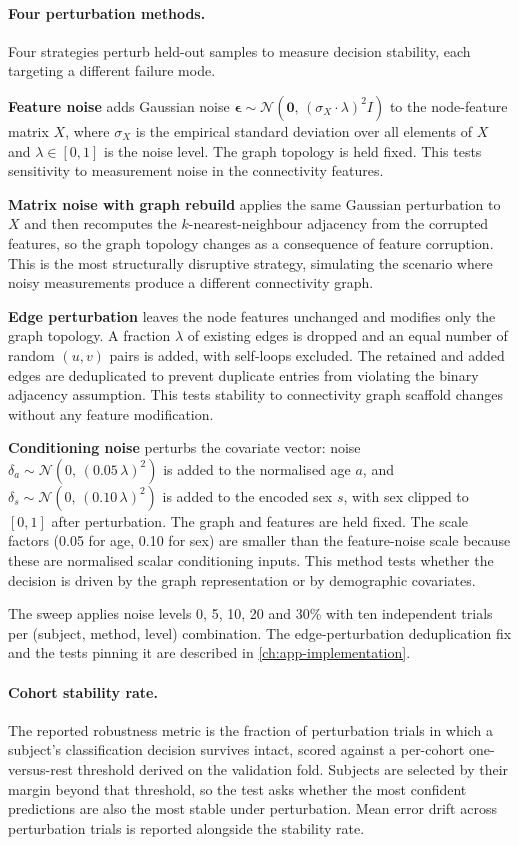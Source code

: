 \paragraph{Four perturbation methods.}
Four strategies perturb held-out samples to measure decision stability, each targeting a
different failure mode.

\textbf{Feature noise} adds Gaussian noise
$\boldsymbol{\epsilon} \sim \mathcal{N}(\mathbf{0},\, (\sigma_X \cdot \lambda)^2 I)$
to the node-feature matrix $X$, where $\sigma_X$ is the empirical standard deviation over
all elements of $X$ and $\lambda \in [0,1]$ is the noise level. The graph topology is
held fixed. This tests sensitivity to measurement noise in the connectivity features.

\textbf{Matrix noise with graph rebuild} applies the same Gaussian perturbation to $X$ and
then recomputes the $k$-nearest-neighbour adjacency from the corrupted features, so the
graph topology changes as a consequence of feature corruption. This is the most
structurally disruptive strategy, simulating the scenario where noisy measurements produce
a different connectivity graph.

\textbf{Edge perturbation} leaves the node features unchanged and modifies only the graph
topology. A fraction $\lambda$ of existing edges is dropped and an equal number of random
$(u,v)$ pairs is added, with self-loops excluded. The retained and added edges are
deduplicated to prevent duplicate entries from violating the binary adjacency
assumption. This tests stability to connectivity graph scaffold changes
without any feature modification.

\textbf{Conditioning noise} perturbs the covariate vector: noise
$\delta_a \sim \mathcal{N}(0,\, (0.05\,\lambda)^2)$ is added to the normalised age $a$,
and $\delta_s \sim \mathcal{N}(0,\, (0.10\,\lambda)^2)$ is added to the encoded sex $s$,
with sex clipped to $[0,1]$ after perturbation. The graph and features are held fixed.
The scale factors (0.05 for age, 0.10 for sex) are smaller than the feature-noise scale
because these are normalised scalar conditioning inputs. This method tests whether the
decision is driven by the graph representation or by demographic covariates.

The sweep applies noise levels 0, 5, 10, 20 and 30\% with ten independent trials per
(subject, method, level) combination. The edge-perturbation deduplication fix and the
tests pinning it are described in \autoref{ch:app-implementation}.

\paragraph{Cohort stability rate.}
The reported robustness metric is the fraction of perturbation trials in which a subject's
classification decision survives intact, scored against a per-cohort one-versus-rest
threshold derived on the validation fold. Subjects are selected by their margin beyond that
threshold, so the test asks whether the most confident predictions are also the most stable
under perturbation. Mean error drift across perturbation trials is reported alongside the
stability rate.


